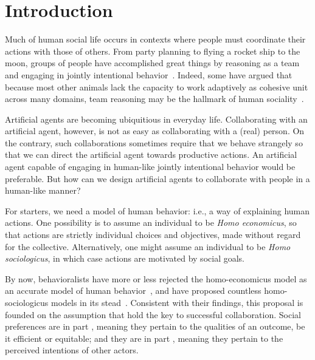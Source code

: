 
\section{Introduction}
\label{sec:intro}

Much of human social life occurs in contexts where people must
coordinate their actions with those of others.  From party planning to
flying a rocket ship to the moon, groups of people have accomplished
great things by reasoning as a team and engaging in jointly
intentional behavior~\cite{searle1995construction}.  Indeed, some have
argued that because most other animals lack the capacity to work
adaptively as cohesive unit across many domains, team reasoning may be
the hallmark of human sociality~\cite{tomasello2005understanding}.


Artificial agents are becoming ubiquitious in everyday life.
Collaborating with an artificial agent, however, is not as easy as
collaborating with a (real) person.  On the contrary, such
collaborations sometimes require that we behave strangely so that we
can direct the artificial agent towards productive actions.  An
artificial agent capable of engaging in human-like jointly intentional
behavior 
would be preferable.  But how can we design artificial agents to
collaborate with people in a human-like manner?

For starters, we need a model of human behavior: i.e., a way of
explaining human actions.  One possibility is to assume an individual
to be \emph{Homo economicus}, so that actions are strictly individual
choices and objectives, made without regard for the collective.
Alternatively, one might assume an individual to be \emph{Homo
  sociologicus}, in which case actions are motivated by social goals.

By now, behavioralists have more or less rejected the homo-economicus
model as an accurate model of human behavior~\cite{Kahnemann, etc.}, and have
proposed countless homo-sociologicus models in its stead~\cite{ADD CITATIONS}.
%
Consistent with their findings, this proposal is founded on the
assumption that  hold the key to successful
collaboration.
%
Social preferences are in part , meaning they
pertain to the qualities of an outcome, be it efficient or equitable;
and they are in part , meaning they pertain to the
perceived intentions of other actors.

